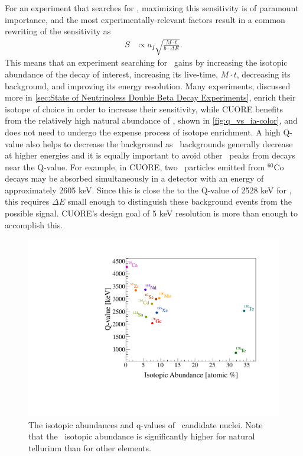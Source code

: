 For an experiment that searches for \zeronubb, maximizing this sensitivity is of paramount importance, and the most experimentally-relevant factors result in a common rewriting of the sensitivity as
\begin{align}
S &\propto a_I \sqrt{\frac{M \cdot t}{b \cdot \Delta E}}.
\end{align}
This means that an experiment searching for \zeronubb~gains by increasing the isotopic abundance of the decay of interest, increasing its live-time, $M\cdot t$, decreasing its background, and improving its energy resolution. Many experiments, discussed more in \autoref{sec:State of Neutrinoless Double Beta Decay Experiments}, enrich their isotope of choice in order to increase their sensitivity, while CUORE benefits from the relatively high natural abundance of \teonethirty, shown in \autoref{fig:q_vs_ia-color}, and does not need to undergo the expense process of isotope enrichment. A high Q-value also helps to decrease the background as \gamma~backgrounds generally decrease at higher energies and it is equally important to avoid other \gamma~peaks from decays near the Q-value. For example, in CUORE, two \gamma~particles emitted from $^{60}\textrm{Co}$ decays may be absorbed simultaneously in a detector with an energy of approximately 2605 keV. Since this is close the to the Q-value of 2528 keV for \teonethirty, this requires $\Delta E$ small enough to distinguish these background events from the possible signal. CUORE's design goal of 5 keV resolution is more than enough to accomplish this.

\begin{figure}[htbp]
    \centering
    \includegraphics[width=0.8\linewidth]{Figures/q_vs_ia-color.pdf}
    \caption[The isotopic abundances and q-values of \zeronubb~candidate nuclei.]{The isotopic abundances and q-values of \zeronubb~candidate nuclei. Note that the \teonethirty~isotopic abundance is significantly higher for natural tellurium than for other elements.}
    \label{fig:q_vs_ia-color}
\end{figure}


